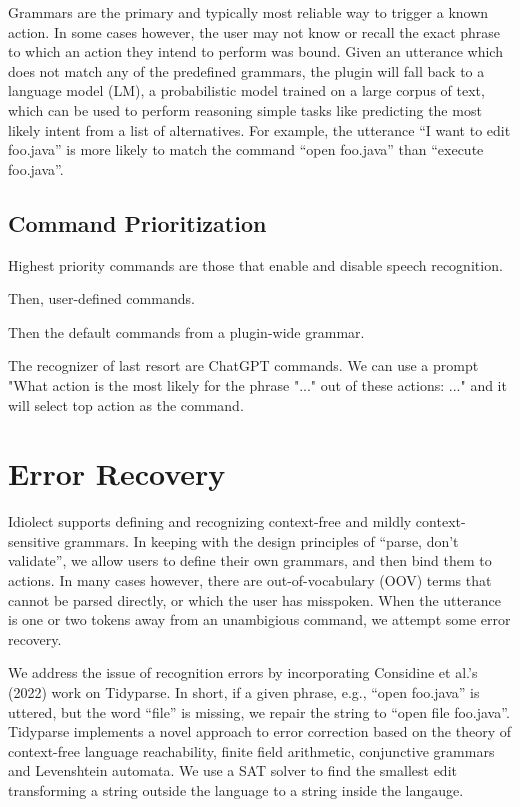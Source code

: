 \documentclass[conference]{IEEEtran}
\begin{document}
Grammars are the primary and typically most reliable way to trigger a known action. In some cases however, the user may not know or recall the exact phrase to which an action they intend to perform was bound. Given an utterance which does not match any of the predefined grammars, the plugin will fall back to a language model (LM), a probabilistic model trained on a large corpus of text, which can be used to perform reasoning simple tasks like predicting the most likely intent from a list of alternatives. For example, the utterance ``I want to edit foo.java'' is more likely to match the command ``open foo.java'' than ``execute foo.java''.

\subsection{Command Prioritization}

Highest priority commands are those that enable and disable speech recognition.

Then, user-defined commands.

Then the default commands from a plugin-wide grammar.

The recognizer of last resort are ChatGPT commands. We can use a prompt "What action is the most likely for the phrase "..." out of these actions: ..." and it will select top action as the command.

\section{Error Recovery}

Idiolect supports defining and recognizing context-free and mildly context-sensitive grammars. In keeping with the design principles of ``parse, don't validate'', we allow users to define their own grammars, and then bind them to actions. In many cases however, there are out-of-vocabulary (OOV) terms that cannot be parsed directly, or which the user has misspoken. When the utterance is one or two tokens away from an unambigious command, we attempt some error recovery.

We address the issue of recognition errors by incorporating Considine et al.'s (2022) work on Tidyparse. In short, if a given phrase, e.g., ``open foo.java'' is uttered, but the word ``file'' is missing, we repair the string to ``open file foo.java''. Tidyparse implements a novel approach to error correction based on the theory of context-free language reachability, finite field arithmetic, conjunctive grammars and Levenshtein automata. We use a SAT solver to find the smallest edit transforming a string outside the language to a string inside the langauge.
\end{document}
